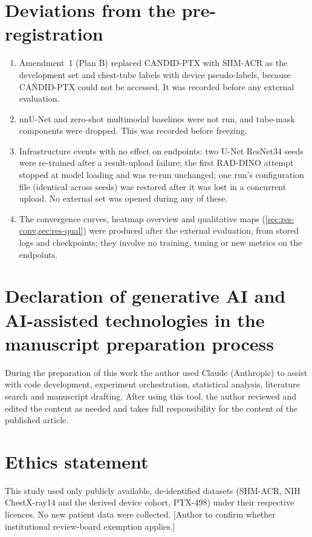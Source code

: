 \documentclass[final,3p]{elsarticle}
\begin{document}
\section*{Deviations from the pre-registration}
\begin{enumerate}
  \item Amendment~1 (Plan B) replaced CANDID-PTX with SIIM-ACR as the development set and chest-tube labels with device pseudo-labels, because CANDID-PTX could not be accessed. It was recorded before any external evaluation.
  \item nnU-Net and zero-shot multimodal baselines were not run, and tube-mask components were dropped. This was recorded before freezing.
  \item Infrastructure events with no effect on endpoints: two U-Net ResNet34 seeds were re-trained after a result-upload failure; the first RAD-DINO attempt stopped at model loading and was re-run unchanged; one run's configuration file (identical across seeds) was restored after it was lost in a concurrent upload. No external set was opened during any of these.
  \item The convergence curves, heatmap overview and qualitative maps (\cref{sec:res-conv,sec:res-qual}) were produced after the external evaluation, from stored logs and checkpoints; they involve no training, tuning or new metrics on the endpoints.
\end{enumerate}

\section*{Declaration of generative AI and AI-assisted technologies in the manuscript preparation process}
During the preparation of this work the author used Claude (Anthropic) to assist with code development, experiment orchestration, statistical analysis, literature search and manuscript drafting. After using this tool, the author reviewed and edited the content as needed and takes full responsibility for the content of the published article.

\section*{Ethics statement}
This study used only publicly available, de-identified datasets (SIIM-ACR, NIH ChestX-ray14 and the derived device cohort, PTX-498) under their respective licences. No new patient data were collected. [Author to confirm whether institutional review-board exemption applies.]
\end{document}
